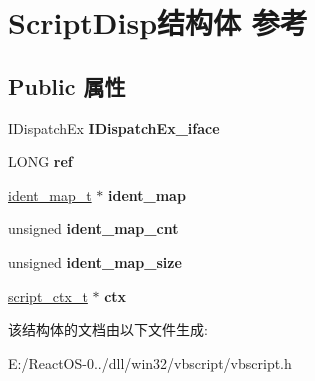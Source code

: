 \hypertarget{struct_script_disp}{}\section{Script\+Disp结构体 参考}
\label{struct_script_disp}
\subsection*{Public 属性}
\begin{DoxyCompactItemize}
\item 
\mbox{\label{struct_script_disp_af56c05880e1cd6ed7c11f42c9b685672}} 
I\+Dispatch\+Ex {\bfseries I\+Dispatch\+Ex\+\_\+iface}
\item 
\mbox{\label{struct_script_disp_a7c131d9575ec44455d9cee5b7e901c09}} 
L\+O\+NG {\bfseries ref}
\item 
\mbox{\label{struct_script_disp_a976e45a05239914a4c4f3a644379d47e}} 
\hyperlink{struct__ident__map__t}{ident\+\_\+map\+\_\+t} $\ast$ {\bfseries ident\+\_\+map}
\item 
\mbox{\label{struct_script_disp_ae9481c5395bde939a79d5290ccde90bf}} 
unsigned {\bfseries ident\+\_\+map\+\_\+cnt}
\item 
\mbox{\label{struct_script_disp_a51a5341bb3c7394c994072414c5e959d}} 
unsigned {\bfseries ident\+\_\+map\+\_\+size}
\item 
\mbox{\label{struct_script_disp_ada44e40038c5023d7840e4bfa7a04cc4}} 
\hyperlink{struct__script__ctx__t}{script\+\_\+ctx\+\_\+t} $\ast$ {\bfseries ctx}
\end{DoxyCompactItemize}


该结构体的文档由以下文件生成\+:\begin{DoxyCompactItemize}
\item 
E\+:/\+React\+O\+S-\/0../dll/win32/vbscript/vbscript.\+h\end{DoxyCompactItemize}
